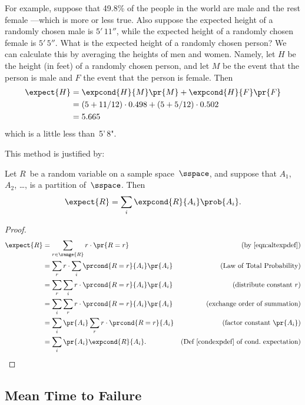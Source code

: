 For example, suppose that 49.8\% of the people in the world are male and
the rest female ---which is more or less true.  Also suppose the expected
height of a randomly chosen male is $5'\,11''$, while the expected height
of a randomly chosen female is $5'\,5''$.  What is the expected height of a
randomly chosen person?  We can calculate this by averaging the
heights of men and women.  Namely, let $H$ be the height (in feet) of a
randomly chosen person, and let $M$ be the event that the person is male
and $F$ the event that the person is female.  Then
\begin{align*}
\expect{H} &= \expcond{H}{M} \pr{M} + \expcond{H}{F} \pr{F}\\
&= (5 + 11/12) \cdot 0.498  + (5+ 5/12) \cdot 0.502\\
&= 5.665
\end{align*}
which is a little less than~5'\,8".

This method is justified by:

\begin{theorem}\label{total_expect} %
Let $R$~be a random variable on a sample space~$\sspace$, and suppose
that $A_1$, $A_2$, \dots, is a partition of~$\sspace$.  Then
\[
    \expect{R} = \sum_i \expcond{R}{A_i} \prob{A_i}.
\]
\end{theorem}

\begin{proof}
  \begin{align*}
    \expect{R} & = \sum_{r \in \range{R}} r \cdot \pr{R=r}
                   & \text{(by~\ref{eqn:altexpdef})}\\
    &= \sum_r r \cdot \sum_i \prcond{R=r}{A_i} \pr{A_i}
            & \text{(Law of Total Probability)}\\
    &= \sum_r \sum_i r \cdot \prcond{R=r}{A_i} \pr{A_i}
              & \text{(distribute constant $r$)}\\
    &= \sum_i \sum_r r \cdot \prcond{R=r}{A_i} \pr{A_i}
              & \text{(exchange order of summation)}\\
    &= \sum_i \pr{A_i} \sum_r r \cdot \prcond{R=r}{A_i}
             & \text{(factor constant $\pr{A_i}$)}\\
    &= \sum_i \pr{A_i} \expcond{R}{A_i}.
             & \text{(Def~\ref{condexpdef} of cond.\ expectation)}
  \end{align*}
\end{proof}


\subsection{Mean Time to Failure}\label{mean_time_to_failure_subsec}

